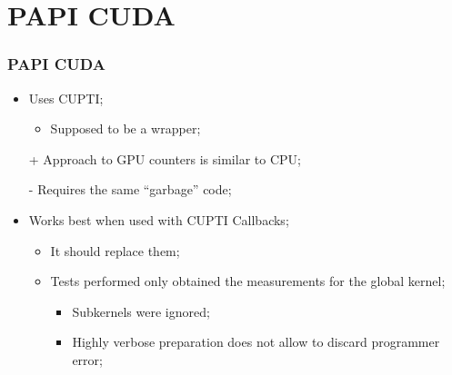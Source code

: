 \section{PAPI CUDA}

\begin{frame}
	\frametitle{PAPI CUDA}
	\begin{itemize}
		\item Uses CUPTI;
		\begin{itemize}
			\item Supposed to be a wrapper;
		\end{itemize}
		\vfill
		\item [+] Approach to GPU counters is similar to CPU;
		\vfill
		\item [-] Requires the same ``garbage'' code;
		\vfill
		\item Works best when used with CUPTI Callbacks;
		\begin{itemize}
			\item It should replace them;
			\item Tests performed only obtained the measurements for the global kernel;
			\begin{itemize}
				\item Subkernels were ignored;
				\item Highly verbose preparation does not allow to discard programmer error;
			\end{itemize}
		\end{itemize}
	\end{itemize}
\end{frame}
